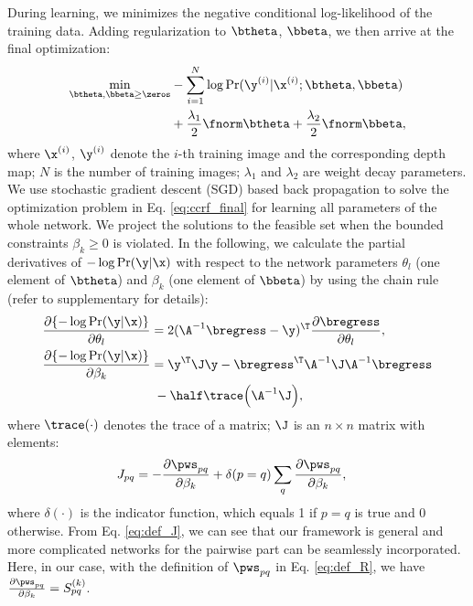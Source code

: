 %
%
%
%
%
%
%
%
%
%
%
%
%
During learning, we minimizes the negative conditional log-likelihood of the training data. Adding regularization to $\btheta$, $\bbeta$, we then arrive at the final optimization:
\begin{align} \label{eq:ccrf_final}
\min_{\btheta, \bbeta \geq \zeros} &-\sum_{i=1}^N \log\Pr(\y^{(i)} | \x^{(i)}; \btheta, \bbeta) \\ \notag 
&+ \frac{\lambda_1}{2} \fnorm \btheta + \frac{\lambda_2}{2} \fnorm \bbeta,
\end{align} 
where $\x^{(i)}$, $\y^{(i)}$ denote the $i$-th training image and the corresponding depth map; $N$ is the number of training images; $\lambda_1$ and $\lambda_2$ are weight decay parameters.
We use stochastic gradient descent (SGD) based back propagation to solve the optimization problem in Eq.  \eqref{eq:ccrf_final} for learning all parameters of the whole network.
%
We project the solutions to the feasible set when the bounded constraints $\beta_k \geq 0$ is violated.
In the following, we calculate the partial derivatives of $-\log\Pr(\y|\x)$ with respect to the network parameters $\theta_l$ (one element of $\btheta$) and $\beta_k$ (one element of $\bbeta$) by using the chain rule (refer to supplementary for details): 
%
\begin{align}   
\frac{\partial \{ -\log\Pr(\y|\x)\} }{\partial \theta_l} 
%
%
%
& = 2 (\A^{-1} \bregress - \y)^{\T} \frac{\partial \bregress}{\partial \theta_l}, \label{eq:derive_z} \\
%
%
\frac{\partial \{ -\log\Pr(\y|\x)\} }{\partial \beta_k} 
& = \y^{\T} \J \y - \bregress^{\T} \A^{-1} \J \A^{-1}\bregress \notag \\
& \; - \half \trace \Big( \A^{-1} \J \Big),  \label{eq:derive_beta_final}
\end{align}
%
%
%
%
%
%
%
where $\trace(\cdot)$ denotes the trace of a matrix; $\J$ is an $n \times n$ matrix with elements:
\begin{align}  \label{eq:def_J}
J_{pq}& =  - \frac{\partial  \pws_{pq} }{\partial \beta_k} 
+ \delta(p=q) \sum_q \frac{\partial  \pws_{pq} }{\partial \beta_k}, 
\end{align}
where $\delta(\cdot)$ is the indicator function, which equals 1 if $p=q$ is true and 0 otherwise. 
From Eq. \eqref{eq:def_J}, we can see that our framework is general and more complicated networks for the pairwise part can be seamlessly incorporated.
Here, in our case, with the definition of $\pws_{pq}$ in Eq. \eqref{eq:def_R}, we have $\frac{\partial  \pws_{pq} }{\partial \beta_k}=S_{pq}^{(k)}$.
%
%
%
%
%
%
%
%
%
%
%
%



